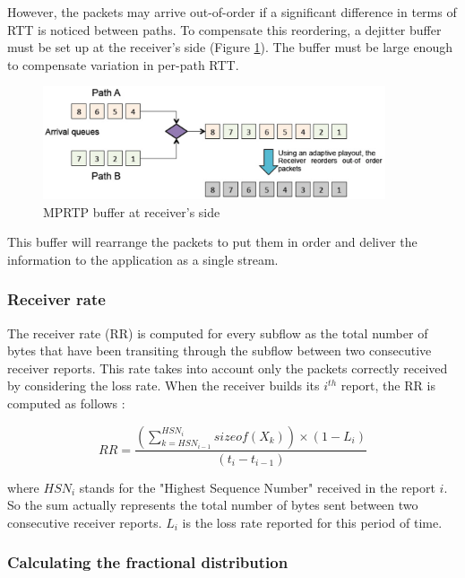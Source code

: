 However, the packets may arrive out-of-order if a significant difference in terms of RTT is noticed between paths. To compensate this reordering, a dejitter buffer must be set up at the receiver's side (Figure \ref{fig:mprtp-dejitter}). The buffer must be large enough to compensate variation in per-path RTT.

\begin{figure}[!ht]
\centering
\includegraphics[width=0.9\textwidth]{images/mprtp-dejitter}
\caption{MPRTP buffer at receiver's side}
\label{fig:mprtp-dejitter}
\end{figure}

This buffer will rearrange the packets to put them in order and deliver the information to the application as a single stream.

\subsubsection{Receiver rate}

The receiver rate (RR) is computed for every subflow as the total number of bytes that have been transiting through the subflow between two consecutive receiver reports. This rate takes into account only the packets correctly received by considering the loss rate. When the receiver builds its $i^{th}$ report, the RR is computed as follows :

\begin{equation*}
RR = \frac{(\sum_{k = HSN_{i-1}}^{HSN_i} sizeof(X_k)) \times (1 - L_i)}{(t_i - t_{i-1})}
\end{equation*}

where $HSN_i$ stands for the "Highest Sequence Number" received in the report $i$. So the sum actually represents the total number of bytes sent between two consecutive receiver reports. $L_i$ is the loss rate reported for this period of time.

\subsubsection{Calculating the fractional distribution}

